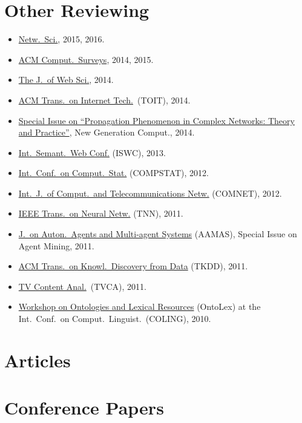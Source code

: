 \documentclass[line,mm]{res}
\newcounter{x}
\newcounter{y}
\begin{document}
\begin{resume}
\section{Other Reviewing}
\begin{itemize}
\item \href{http://journals.cambridge.org/action/displayJournal?jid=NWS}{Netw.\ Sci.}, 2015, 2016.
\item \href{http://surveys.acm.org/}{ACM Comput.\ Surveys}, 2014, 2015. 
\item \href{http://www.webscience-journal.net}{The J.\ of Web Sci.}, 2014. 
\item \href{http://toit.acm.org/}{ACM Trans.\ on Internet
  Tech.}\ (TOIT), 2014.  
\item \href{http://www.ii.pwr.wroc.pl/~krol/eng_EPP.htm}{Special
  Issue on ``Propagation Phenomenon in Complex Networks:  Theory and
  Practice''}, New Generation Comput., 2014. 
\item \href{http://iswc2013.semanticweb.org/}{Int.\ Semant.\ Web Conf.}
  (ISWC), 2013.  
\item \href{http://www.compstat2012.org/}{Int.\ Conf.\ on Comput.\ Stat.} (COMPSTAT), 2012.  
\item
  \href{http://www.journals.elsevier.com/computer-networks/}{Int.\ J.\ of
    Comput.\ and Telecommunications Netw.} (COMNET), 2012. 
\item \href{http://ieee-cis.org/pubs/tnn/}{IEEE Trans.\ on Neural
  Netw.} (TNN), 2011.   
\item
  \href{http://www.springer.com/computer/ai/journal/10458}{J.\ on Auton.\ Agents and Multi-agent Systems} (AAMAS), Special Issue on Agent Mining,
  2011. 
\item \href{http://tkdd.cs.uiuc.edu/}{ACM Trans.\ on Knowl.\ Discovery from Data} (TKDD), 2011.  
\item \href{http://mklab.iti.gr/tvca/}{TV Content Anal.}\ (TVCA), 2011.
\item \href{http://www.loa-cnr.it/ontolex2010}{Workshop on Ontologies
  and Lexical Resources} (OntoLex) at the Int.\ Conf.\ on Comput.\ Linguist.\ (COLING), 2010. 
\end{itemize}

\section{Articles}           
\section{Conference Papers}  

\end{resume}
\end{document}
